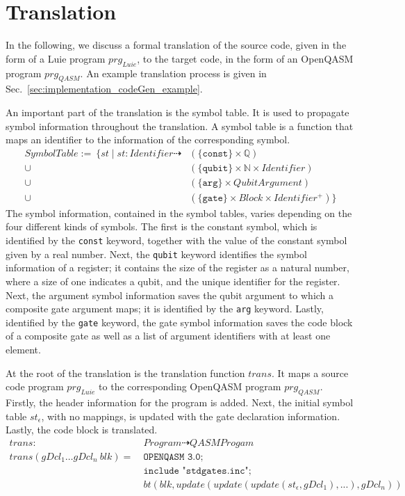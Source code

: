 \section{Translation}
\label{sec:concept_translation}
In the following, we discuss a formal translation of the source code, given in the form of a Luie program $prg_{Luie}$, to the target code, in the form of an OpenQASM program $prg_{QASM}$. An example translation process is given in Sec.~\ref{sec:implementation_codeGen_example}.

An important part of the translation is the symbol table. It is used to propagate symbol information throughout the translation. A symbol table is a function that maps an identifier to the information of the corresponding symbol.
\begin{align*}
    SymbolTable := \ \{st \mid st : Identifier \dashrightarrow & (\{\texttt{const}\} \times \mathbb{Q})\\
     \cup& (\{\texttt{qubit}\} \times \mathbb{N} \times Identifier)\\
     \cup& (\{\texttt{arg}\} \times QubitArgument)\\
     \cup& (\{\texttt{gate}\} \times Block \times Identifier^+)
    \}
\end{align*}
The symbol information, contained in the symbol tables, varies depending on the four different kinds of symbols. The first is the constant symbol, which is identified by the \texttt{const} keyword, together with the value of the constant symbol given by a real number. Next, the \texttt{qubit} keyword identifies the symbol information of a register; it contains the size of the register as a natural number, where a size of one indicates a qubit, and the unique identifier for the register. Next, the argument symbol information saves the qubit argument to which a composite gate argument maps; it is identified by the \texttt{arg} keyword. Lastly, identified by the \texttt{gate} keyword, the gate symbol information saves the code block of a composite gate as well as a list of argument identifiers with at least one element.

At the root of the translation is the translation function $trans$. It maps a source code program $prg_{Luie}$ to the corresponding OpenQASM program $prg_{QASM}$. Firstly, the header information for the program is added. Next, the initial symbol table $st_\epsilon$, with no mappings, is updated with the gate declaration information. Lastly, the code block is translated. 
\begin{align*}
    trans : \ & Program \dashrightarrow QASMProgam\\
    trans(gDcl_1 \dots gDcl_n \ blk) = \ & \texttt{OPENQASM 3.0;}\\
                & \texttt{include "stdgates.inc";}\\
                & bt(blk, update(update(update(st_\epsilon, gDcl_1), ...), gDcl_n))
\end{align*}  

